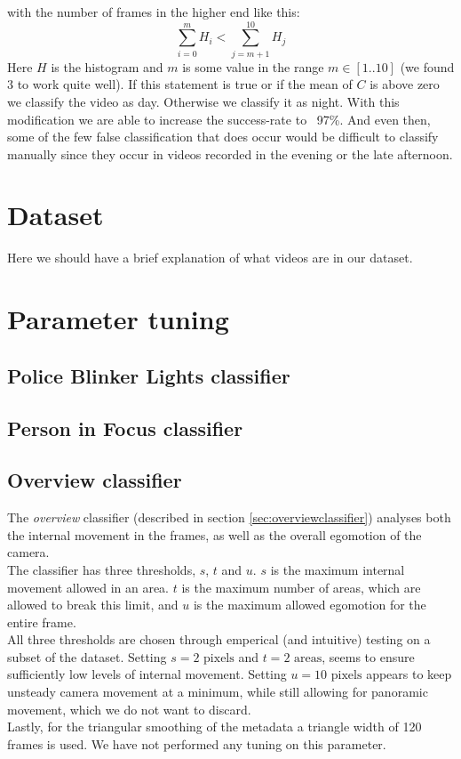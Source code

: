%
with the number of frames in the higher end like this:
%
\begin{equation}
\sum_{i=0}^{m}H_{i} < \sum_{j=m+1}^{10}H_{j}
\end{equation}
%
%
%
Here $H$ is the histogram and $m$ is some value in the range $m\in [1..10]$ (we found $3$ to work quite well). If this statement is true or if the mean of $C$ is above zero we classify the video as day. Otherwise we classify it as night. With this modification we are able to increase the success-rate to ~97\%. And even then, some of the few false classification that does occur would be difficult to classify manually since they occur in videos recorded in the evening or the late afternoon.
%
\section{Dataset}
%
Here we should have a brief explanation of what videos are in our dataset.
%
\section{Parameter tuning}
%
\subsection{Police Blinker Lights classifier}
\subsection{Person in Focus classifier}
\subsection{Overview classifier}
%
The \textit{overview} classifier (described in section \ref{sec:overviewclassifier}) analyses both the internal movement in the frames, as well as the overall egomotion of the camera.\\
The classifier has three thresholds, $s$, $t$ and $u$. $s$ is the maximum internal movement allowed in an area. $t$ is the maximum number of areas, which are allowed to break this limit, and $u$ is the maximum allowed egomotion for the entire frame.\\
All three thresholds are chosen through emperical (and intuitive) testing on a subset of the dataset. Setting $s = 2 \text{ pixels}$ and $t = 2 \text{ areas}$, seems to ensure sufficiently low levels of internal movement. Setting $u = 10 \text{ pixels}$ appears to keep unsteady camera movement at a minimum, while still allowing for panoramic movement, which we do not want to discard.\\
Lastly, for the triangular smoothing of the metadata a triangle width of 120 frames is used. We have not performed any tuning on this parameter.
%
